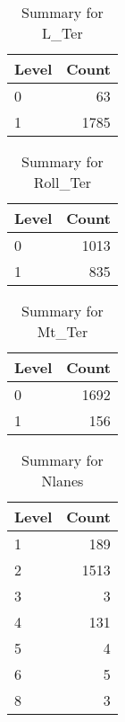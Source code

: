 \begin{table}[ht]
\centering
\begin{tabular}{lr}
  \hline
Level & Count \\ 
  \hline
0 &  63 \\ 
  1 & 1785 \\ 
   \hline
\end{tabular}
\caption{Summary for L_Ter} 
\label{tab: L_Ter}
\end{table}
\begin{table}[ht]
\centering
\begin{tabular}{lr}
  \hline
Level & Count \\ 
  \hline
0 & 1013 \\ 
  1 & 835 \\ 
   \hline
\end{tabular}
\caption{Summary for Roll_Ter} 
\label{tab: Roll_Ter}
\end{table}
\begin{table}[ht]
\centering
\begin{tabular}{lr}
  \hline
Level & Count \\ 
  \hline
0 & 1692 \\ 
  1 & 156 \\ 
   \hline
\end{tabular}
\caption{Summary for Mt_Ter} 
\label{tab: Mt_Ter}
\end{table}
\begin{table}[ht]
\centering
\begin{tabular}{lr}
  \hline
Level & Count \\ 
  \hline
1 & 189 \\ 
  2 & 1513 \\ 
  3 &   3 \\ 
  4 & 131 \\ 
  5 &   4 \\ 
  6 &   5 \\ 
  8 &   3 \\ 
   \hline
\end{tabular}
\caption{Summary for Nlanes} 
\label{tab: Nlanes}
\end{table}
